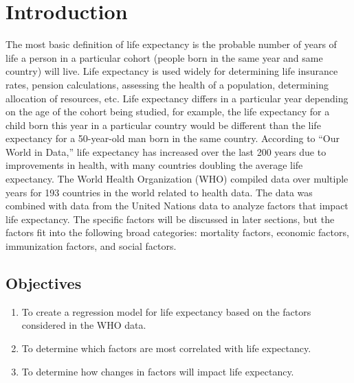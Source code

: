 \section{Introduction}
The most basic definition of life expectancy is the probable number of years of life a person in a particular cohort (people born in the same year and same country) will live. Life expectancy is used widely for determining life insurance rates, pension calculations, assessing the health of a population, determining allocation of resources, etc. Life expectancy differs in a particular year depending on the age of the cohort being studied, for example, the life expectancy for a child born this year in a particular country would be different than the life expectancy for a 50-year-old man born in the same country. According to “Our World in Data,” \cite{owidlifeexpectancy} life expectancy has increased over the last 200 years due to improvements in health, with many countries doubling the average life expectancy. 
The World Health Organization (WHO) compiled data over multiple years for 193 countries in the world related to health data. The data was combined with data from the United Nations data to analyze factors that impact life expectancy. The specific factors will be discussed in later sections, but the factors fit into the following broad categories: mortality factors, economic factors, immunization factors, and social factors. 

\subsection{Objectives}
\label{objectives}


\begin{enumerate}
\item To create a regression model for life expectancy based on the factors considered in the WHO data.
\item To determine which factors are most correlated with life expectancy.
\item To determine how changes in factors will impact life expectancy.   
\end{enumerate}


